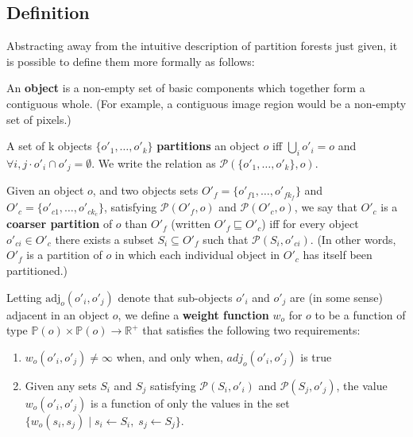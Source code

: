 \subsection{Definition}

Abstracting away from the intuitive description of partition forests just given, it is possible to define them more formally as follows:

\begin{definition}
An \textbf{object} is a non-empty set of basic components which together form a contiguous whole. (For example, a contiguous image region would be a non-empty set of pixels.)
\end{definition}

\begin{definition}
A set of k objects $\{o'_1,\ldots,o'_k\}$ \textbf{partitions} an object $o$ iff $\bigcup_i o'_i = o$ and $\forall i,j \cdot o'_i \cap o'_j = \emptyset$. We write the relation as $\mathcal{P}(\{o'_1,\ldots,o'_k\}, o)$.
\end{definition}

\begin{definition}
Given an object $o$, and two objects sets $O'_f = \{o'_{f1},\ldots,o'_{fk_f}\}$ and $O'_c = \{o'_{c1},\ldots,o'_{ck_c}\}$, satisfying $\mathcal{P}(O'_f,o)$ and $\mathcal{P}(O'_c,o)$, we say that $O'_c$ is a \textbf{coarser partition} of $o$ than $O'_f$ (written $O'_f \sqsubseteq O'_c$) iff for every object $o'_{ci} \in O'_c$ there exists a subset $S_i \subseteq O'_f$ such that $\mathcal{P}(S_i,o'_{ci})$. (In other words, $O'_f$ is a partition of $o$ in which each individual object in $O'_c$ has itself been partitioned.)
\end{definition}

\begin{definition}
Letting $\mbox{adj}_o(o'_i, o'_j)$ denote that sub-objects $o'_i$ and $o'_j$ are (in some sense) adjacent in an object $o$, we define a \textbf{weight function} $w_o$ for $o$ to be a function of type $\mathbb{P}(o) \times \mathbb{P}(o) \to \mathbb{R}^+$ that satisfies the following two requirements:
%
\begin{enumerate}

\item $w_o(o'_i, o'_j) \ne \infty$ when, and only when, $adj_o(o'_i, o'_j)$ is true

\item Given any sets $S_i$ and $S_j$ satisfying $\mathcal{P}(S_i,o'_i)$ and $\mathcal{P}(S_j,o'_j)$, the value $w_o(o'_i, o'_j)$ is a function of only the values in the set $\{w_o(s_i, s_j) \; | \; s_i \leftarrow S_i, \; s_j \leftarrow S_j\}$.

\end{enumerate}

\end{definition}

